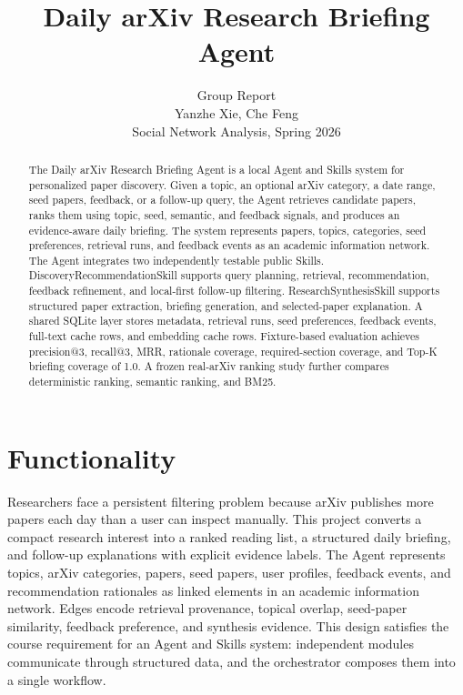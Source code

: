 \documentclass{article}
\title{Daily arXiv Research Briefing Agent}
\author{%
  Group Report \\
  Yanzhe Xie, Che Feng \\
  Social Network Analysis, Spring 2026
}
\begin{document}
\maketitle

\begin{abstract}
The Daily arXiv Research Briefing Agent is a local Agent and Skills system for personalized paper discovery. Given a topic, an optional arXiv category, a date range, seed papers, feedback, or a follow-up query, the Agent retrieves candidate papers, ranks them using topic, seed, semantic, and feedback signals, and produces an evidence-aware daily briefing. The system represents papers, topics, categories, seed preferences, retrieval runs, and feedback events as an academic information network. The Agent integrates two independently testable public Skills. DiscoveryRecommendationSkill supports query planning, retrieval, recommendation, feedback refinement, and local-first follow-up filtering. ResearchSynthesisSkill supports structured paper extraction, briefing generation, and selected-paper explanation. A shared SQLite layer stores metadata, retrieval runs, seed preferences, feedback events, full-text cache rows, and embedding cache rows. Fixture-based evaluation achieves precision@3, recall@3, MRR, rationale coverage, required-section coverage, and Top-K briefing coverage of 1.0. A frozen real-arXiv ranking study further compares deterministic ranking, semantic ranking, and BM25.
\end{abstract}

\section{Functionality}

Researchers face a persistent filtering problem because arXiv publishes more papers each day than a user can inspect manually. This project converts a compact research interest into a ranked reading list, a structured daily briefing, and follow-up explanations with explicit evidence labels. The Agent represents topics, arXiv categories, papers, seed papers, user profiles, feedback events, and recommendation rationales as linked elements in an academic information network. Edges encode retrieval provenance, topical overlap, seed-paper similarity, feedback preference, and synthesis evidence. This design satisfies the course requirement for an Agent and Skills system: independent modules communicate through structured data, and the orchestrator composes them into a single workflow.
\end{document}
